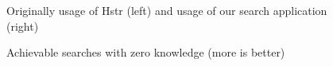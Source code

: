 \begin{figure}
\centering
{}\hfill
{}
\caption{Achievable searches with zero knowledge (more is better)}
\small{Originally usage of Hstr (left) and usage of our search application (right)}
\label{eval-metrics-plot-dist-0-cmds}
\end{figure}

